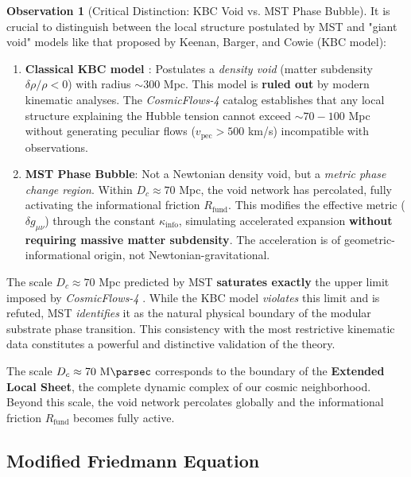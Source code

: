 \documentclass[11pt, a4paper]{article}
\theoremstyle{plain}
\theoremstyle{definition}
\newtheorem{observation}[theorem]{Observation}
\newcommand{\Rfactor}{R_{\text{fund}}}
\newcommand{\Kinfo}{\kappa_{\text{info}}}
\begin{document}
\begin{observation}[Critical Distinction: KBC Void vs. MST Phase Bubble]
\label{obs:kbc_vs_tsm}
It is crucial to distinguish between the local structure postulated by MST and "giant void" models like that proposed by Keenan, Barger, and Cowie (KBC model):

\begin{enumerate}
    \item \textbf{Classical KBC model \cite{KBC2010}}: Postulates a \textit{density void} (matter subdensity $\delta\rho/\rho < 0$) with radius $\sim 300$ Mpc. This model is \textbf{ruled out} by modern kinematic analyses. The \textit{CosmicFlows-4} catalog \cite{Mazurenko2024} establishes that any local structure explaining the Hubble tension cannot exceed $\sim 70-100$ Mpc without generating peculiar flows ($v_{\text{pec}} > 500$ km/s) incompatible with observations.

    \item \textbf{MST Phase Bubble}: Not a Newtonian density void, but a \textit{metric phase change region}. Within $D_c \approx 70$ Mpc, the void network has percolated, fully activating the informational friction $\Rfactor$. This modifies the effective metric ($\delta g_{\mu\nu}$) through the constant $\Kinfo$, simulating accelerated expansion \textbf{without requiring massive matter subdensity}. The acceleration is of geometric-informational origin, not Newtonian-gravitational.
\end{enumerate}

The scale $D_c \approx 70$ Mpc predicted by MST \textbf{saturates exactly} the upper limit imposed by \textit{CosmicFlows-4} \cite{Mazurenko2024}. While the KBC model \textit{violates} this limit and is refuted, MST \textit{identifies} it as the natural physical boundary of the modular substrate phase transition. This consistency with the most restrictive kinematic data constitutes a powerful and distinctive validation of the theory.
\end{observation}

The scale $D_c \approx 70\ \si{\mega\parsec}$ corresponds to the boundary of the \textbf{Extended Local Sheet}, the complete dynamic complex of our cosmic neighborhood. Beyond this scale, the void network percolates globally and the informational friction $\Rfactor$ becomes fully active.

\subsection{Modified Friedmann Equation}
\end{document}
